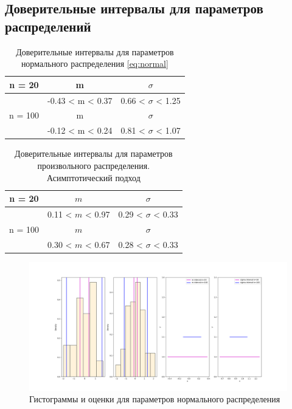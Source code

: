 \documentclass[12pt,a4paper]{article}
\begin{document}
	\newpage

	\subsection{Доверительные интервалы для параметров распределений}

	\begin{table}[htbp!]
		\centering
		\begin{tabular}{ |c|c|c| }
			\hline
			n = 20 & m & \( \sigma \) \\
			\hline
			& -0.43 < m < 0.37 & 0.66 < \( \sigma \) < 1.25 \\
			\hline
			n = 100 & m & \( \sigma \) \\
			\hline
			& -0.12 < m < 0.24 & 0.81 < \( \sigma \) < 1.07 \\
			\hline
		\end{tabular}
		\caption{Доверительные интервалы для параметров нормального
			распределения \eqref{eq:normal}}
	\end{table}

	\begin{table}[htbp!]
		\centering
		\begin{tabular}{ |c|c|c| }
			\hline
			n = 20 & \( m \) & \( \sigma \) \\
			\hline
			& 0.11 < \( m \) < 0.97 & 0.29 < \( \sigma \) < 0.33 \\
			\hline
			n = 100 & \( m \) & \( \sigma \) \\
			\hline
			& 0.30 < \( m \) < 0.67 & 0.28 < \( \sigma \) < 0.33 \\
			\hline
		\end{tabular}
		\caption{Доверительные интервалы для параметров произвольного
			распределения. Асимптотический подход}
	\end{table}

	\begin{figure}[htbp!]
		\begin{center}
			\includegraphics[width = 1.12\linewidth]{graphics/lab2_hists.png}
			\caption{Гистограммы и оценки для параметров нормального
				распределения}
		\end{center}
	\end{figure}
\end{document}
